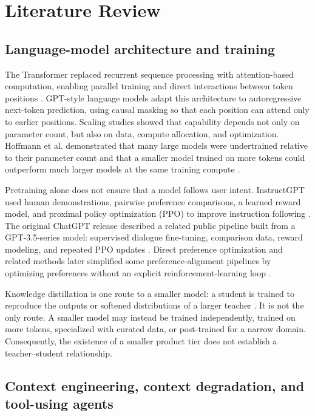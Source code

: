 \documentclass[11pt,a4paper]{article}
\begin{document}
\section{Literature Review}\label{sec:literature}

\subsection{Language-model architecture and training}\label{sec:lit-model}

The Transformer replaced recurrent sequence processing with attention-based computation, enabling parallel training and direct interactions between token positions \cite{vaswani2017}. GPT-style language models adapt this architecture to autoregressive next-token prediction, using causal masking so that each position can attend only to earlier positions. Scaling studies showed that capability depends not only on parameter count, but also on data, compute allocation, and optimization. Hoffmann et al. demonstrated that many large models were undertrained relative to their parameter count and that a smaller model trained on more tokens could outperform much larger models at the same training compute \cite{hoffmann2022}.

Pretraining alone does not ensure that a model follows user intent. InstructGPT used human demonstrations, pairwise preference comparisons, a learned reward model, and proximal policy optimization (PPO) to improve instruction following \cite{ouyang2022,openaiinstruct2022}. The original ChatGPT release described a related public pipeline built from a GPT-3.5-series model: supervised dialogue fine-tuning, comparison data, reward modeling, and repeated PPO updates \cite{openaichatgpt2022}. Direct preference optimization and related methods later simplified some preference-alignment pipelines by optimizing preferences without an explicit reinforcement-learning loop \cite{rafailov2023}.

Knowledge distillation is one route to a smaller model: a student is trained to reproduce the outputs or softened distributions of a larger teacher \cite{hinton2015}. It is not the only route. A smaller model may instead be trained independently, trained on more tokens, specialized with curated data, or post-trained for a narrow domain. Consequently, the existence of a smaller product tier does not establish a teacher--student relationship.

\subsection{Context engineering, context degradation, and tool-using agents}\label{sec:lit-context}
\end{document}
